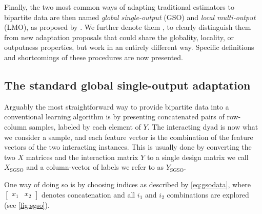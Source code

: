 Finally, the two most common ways of adapting traditional estimators to bipartite data are then named \emph{global single-output} (GSO) and \emph{local multi-output} (LMO), as proposed by \textcite{pliakos2018,pliakos2019,pliakos2020}. We further denote them , to clearly distinguish them from new adaptation proposals that could share the globality, locality, or outputness properties, but work in an entirely different way.
%
Specific definitions and shortcomings of these procedures are now presented.


\subsection{The standard global single-output adaptation}
\label{sec:sgso}

Arguably the most straightforward way to provide bipartite data into a conventional learning algorithm 
is by presenting concatenated pairs of row-column samples, labeled by each element of $Y$.
%
The interacting dyad is now what we consider a sample, and each feature vector is the combination of the feature vectors of the two interacting instances.
This is usually done by converting the two $X$ matrices and the
interaction matrix $Y$ to a single design matrix we call $X_\text{SGSO}$ and a column-vector of labels we refer to as $Y_\text{SGSO}$.

One way of doing so is by choosing indices as described by \autoref{eq:gsodata}, where
$\begin{bmatrix} x_1 & x_2\end{bmatrix}$ denotes concatenation and all $i_1$ and
$i_2$ combinations are explored (see \autoref{fig:sgso}).

